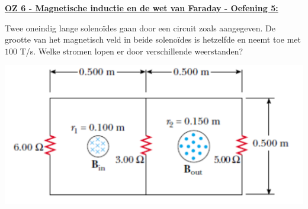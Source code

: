 \textbf{\underline{OZ 6 - Magnetische inductie en de wet van Faraday - Oefening 5:}}
\vspace{0.5cm}

    Twee oneindig lange solenoïdes gaan door een circuit zoals aangegeven. De grootte van het magnetisch veld in beide solenoïdes is hetzelfde en neemt toe met $100$ T/s. Welke stromen lopen er door verschillende weerstanden?

    \begin{center}
        \includegraphics[scale = 0.3]{oz06/resources/Oz6Oef5.png}
    \end{center}

    \begin{description}[labelwidth=1.5cm, leftmargin=!]
        \item[Geg. :]
        \item[Gevr. :] 
        \item[Opl. :]
    \end{description}


\vspace{1cm}